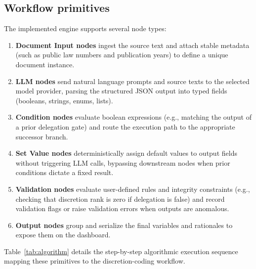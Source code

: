 \documentclass[conference]{IEEEtran}
\begin{document}
\subsection{Workflow primitives}

The implemented engine supports several node types:
\begin{enumerate}[nosep]
  \item \textbf{Document Input nodes} ingest the source text and attach stable metadata (such as public law numbers and publication years) to define a unique document instance.
  \item \textbf{LLM nodes} send natural language prompts and source texts to the selected model provider, parsing the structured JSON output into typed fields (booleans, strings, enums, lists).
  \item \textbf{Condition nodes} evaluate boolean expressions (e.g., matching the output of a prior delegation gate) and route the execution path to the appropriate successor branch.
  \item \textbf{Set Value nodes} deterministically assign default values to output fields without triggering LLM calls, bypassing downstream nodes when prior conditions dictate a fixed result.
  \item \textbf{Validation nodes} evaluate user-defined rules and integrity constraints (e.g., checking that discretion rank is zero if delegation is false) and record validation flags or raise validation errors when outputs are anomalous.
  \item \textbf{Output nodes} group and serialize the final variables and rationales to expose them on the dashboard.
\end{enumerate}

Table~\ref{tab:algorithm} details the step-by-step algorithmic execution sequence mapping these primitives to the discretion-coding workflow.
\end{document}
